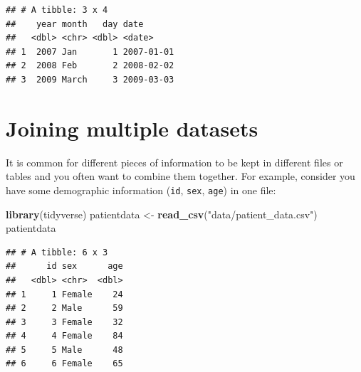 \documentclass[
  12pt,
  krantz2]{krantz}
\makeatletter
\newenvironment{Shaded}{\begin{snugshade}}{\end{snugshade}}
\newcommand{\DataTypeTok}[1]{\textcolor[rgb]{0.13,0.29,0.53}{#1}}
\newcommand{\KeywordTok}[1]{\textcolor[rgb]{0.13,0.29,0.53}{\textbf{#1}}}
\newcommand{\NormalTok}[1]{#1}
\newcommand{\OperatorTok}[1]{\textcolor[rgb]{0.81,0.36,0.00}{\textbf{#1}}}
\newcommand{\StringTok}[1]{\textcolor[rgb]{0.31,0.60,0.02}{#1}}
\newenvironment{kframe}{%
\medskip{}
\setlength{\fboxsep}{.8em}
 \def\at@end@of@kframe{}%
 \ifinner\ifhmode%
  \def\at@end@of@kframe{\end{minipage}}%
  \begin{minipage}{\columnwidth}%
 \fi\fi%
 \def\FrameCommand##1{\hskip\@totalleftmargin \hskip-\fboxsep
 \colorbox{shadecolor}{##1}\hskip-\fboxsep
     \hskip-\linewidth \hskip-\@totalleftmargin \hskip\columnwidth}%
 \MakeFramed {\advance\hsize-\width
   \@totalleftmargin\z@ \linewidth\hsize
   \@setminipage}}%
 {\par\unskip\endMakeFramed%
 \at@end@of@kframe}
\renewenvironment{Shaded}{\begin{kframe}}{\end{kframe}}
\makeatother
\begin{document}
\begin{Shaded}
\end{Shaded}

\begin{verbatim}
## # A tibble: 3 x 4
##    year month   day date      
##   <dbl> <chr> <dbl> <date>    
## 1  2007 Jan       1 2007-01-01
## 2  2008 Feb       2 2008-02-02
## 3  2009 March     3 2009-03-03
\end{verbatim}

\hypertarget{joining-multiple-datasets}{%
\section{Joining multiple datasets}\label{joining-multiple-datasets}}


It is common for different pieces of information to be kept in different files or tables and you often want to combine them together.
For example, consider you have some demographic information (\texttt{id}, \texttt{sex}, \texttt{age}) in one file:

\begin{Shaded}
\begin{Highlighting}[]
\KeywordTok{library}\NormalTok{(tidyverse)}
\NormalTok{patientdata <-}\StringTok{ }\KeywordTok{read_csv}\NormalTok{(}\StringTok{"data/patient_data.csv"}\NormalTok{)}
\NormalTok{patientdata}
\end{Highlighting}
\end{Shaded}

\begin{verbatim}
## # A tibble: 6 x 3
##      id sex      age
##   <dbl> <chr>  <dbl>
## 1     1 Female    24
## 2     2 Male      59
## 3     3 Female    32
## 4     4 Female    84
## 5     5 Male      48
## 6     6 Female    65
\end{verbatim}
\end{document}
